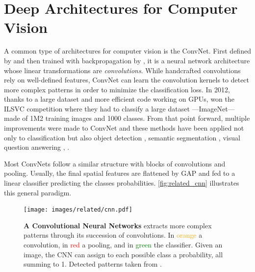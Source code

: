 \section{Deep Architectures for Computer Vision}

A common type of architectures for computer vision is the \acf{ConvNet}. First defined by
\cite{fukushima1980neocognitron} and then trained with backpropagation by \cite{lecun1999lenet}, it
is a neural network architecture whose linear transformations are \textit{convolutions}. While
handcrafted convolutions \citep{lowe1999sift} rely on well-defined features, \ac{ConvNet} can learn
the convolution kernels to detect more complex patterns in order to minimize the classification
loss. In 2012, thanks to a large dataset and more efficient code working on \acp{GPU},
\cite{krizhevsky2012alexnet} won the ILSVC competition \citep{russakovsky2015imagenet_ilsvrc} where
they had to classify a large dataset ---ImageNet--- made of 1M2 training images and 1000 classes.
From that point forward, multiple improvements were made to \ac{ConvNet}
\citep{ioffe2015batchnorm,he2016resnet} and these methods have been applied not only to
classification but also object detection \citep{ren20fasterrcnn}, semantic segmentation
\citep{chen2018deeplab}, visual question answering \citep{antol2015vqa}, \etc.

Most \acp{ConvNet} follow a similar structure with blocks of convolutions and pooling. Usually, the
final spatial features are flattened by \ac{GAP} and fed to a linear classifier
predicting the classes probabilities. \autoref{fig:related_cnn} illustrates this general paradigm.

\begin{figure}[tb]
      \begin{center}
            \texttt{[image: images/related/cnn.pdf]}
      \end{center}
      \caption{\textbf{A Convolutional Neural Networks} extracts more complex patterns through its
            succession of convolutions. In \textcolor{orange}{orange} a convolution, in \textcolor{red}{red}
            a pooling, and in \textcolor{green}{green} the classifier. Given an image, the \ac{CNN} can assign to
            each possible class a probability, all summing to 1.
            Detected patterns taken from \cite{olah2017feature}.}
      \label{fig:related_cnn}
\end{figure}

